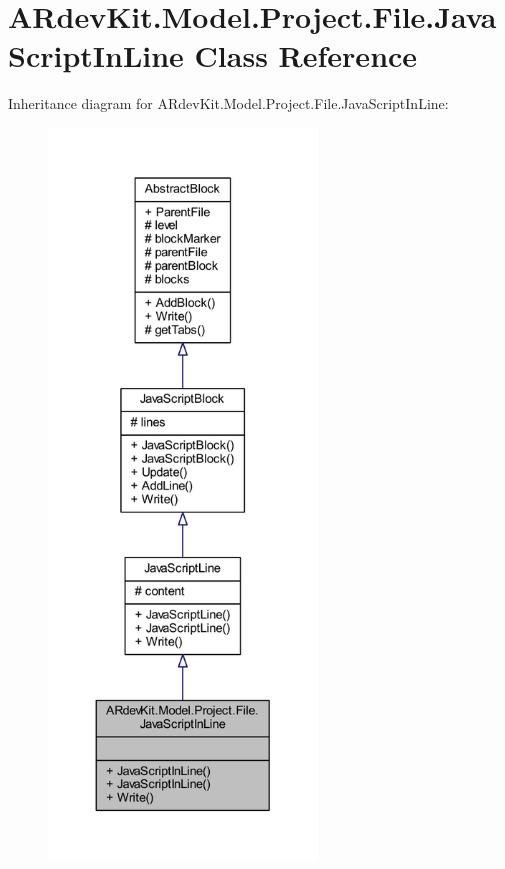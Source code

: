 \hypertarget{class_a_rdev_kit_1_1_model_1_1_project_1_1_file_1_1_java_script_in_line}{\section{A\-Rdev\-Kit.\-Model.\-Project.\-File.\-Java\-Script\-In\-Line Class Reference}
\label{class_a_rdev_kit_1_1_model_1_1_project_1_1_file_1_1_java_script_in_line}
}


Inheritance diagram for A\-Rdev\-Kit.\-Model.\-Project.\-File.\-Java\-Script\-In\-Line\-:
\nopagebreak
\begin{figure}[H]
\begin{center}
\leavevmode
\includegraphics[height=550pt]{class_a_rdev_kit_1_1_model_1_1_project_1_1_file_1_1_java_script_in_line__inherit__graph}
\end{center}
\end{figure}


